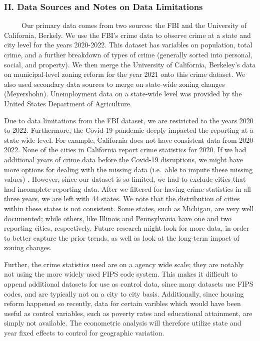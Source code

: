 \documentclass[
  12pt,
]{article}
\begin{document}
\hypertarget{ii.-data-sources-and-notes-on-data-limitations}{%
\subsubsection{II. Data Sources and Notes on Data
Limitations}\label{ii.-data-sources-and-notes-on-data-limitations}}

\setlength\parindent{24pt}

~~~~~Our primary data comes from two sources: the FBI and the University
of California, Berkely. We use the FBI's crime data to observe crime at
a state and city level for the years 2020-2022. This dataset has
variables on population, total crime, and a further breakdown of types
of crime (generally sorted into personal, social, and property). We then
merge the University of California, Berkeley's data on municipal-level
zoning reform for the year 2021 onto this crime dataset. We also used
secondary data sources to merge on state-wide zoning changes
(Meyershohn). Unemployment data on a state-wide level was provided by
the United States Department of Agriculture.

Due to data limitations from the FBI dataset, we are restricted to the
years 2020 to 2022. Furthermore, the Covid-19 pandemic deeply impacted
the reporting at a state-wide level. For example, California does not
have consistent data from 2020-2022. None of the cities in California
report crime statistics for 2020. If we had additional years of crime
data before the Covid-19 disruptions, we might have more options for
dealing with the missing data (i.e.~able to impute these missing values)
. However, since our dataset is so limited, we had to exclude cities
that had incomplete reporting data. After we filtered for having crime
statistics in all three years, we are left with 44 states. We note that
the distribution of cities within these states is not consistent. Some
states, such as Michigan, are very well documented; while others, like
Illinois and Pennsylvania have one and two reporting cities,
respectively. Future research might look for more data, in order to
better capture the prior trends, as well as look at the long-term impact
of zoning changes.

Further, the crime statistics used are on a agency wide scale; they are
notably not using the more widely used FIPS code system. This makes it
difficult to append additional datasets for use as control data, since
many datasets use FIPS codes, and are typically not on a city to city
basis. Additionally, since housing reform happened so recently, data for
certain varibles which would have been useful as control variables, such
as poverty rates and educational attainment, are simply not available.
The econometric analysis will therefore utilize state and year fixed
effects to control for geographic variation.
\end{document}
